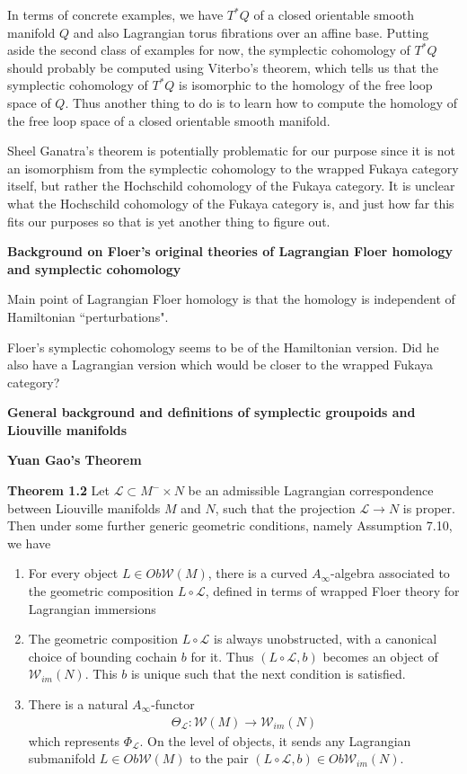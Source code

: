 \documentclass[hidelinks, 12pt]{article}
\theoremstyle{mydefstyle}
\theoremstyle{mythmstyle}
\newcounter{prop}
\begin{document}
In terms of concrete examples, we have $T^*Q$ of a closed orientable smooth manifold $Q$ and also Lagrangian torus fibrations over an affine base. Putting aside the second class of examples for now, the symplectic cohomology of $T^*Q$ should probably be computed using Viterbo's theorem, which tells us that the symplectic cohomology of $T^*Q$ is isomorphic to the homology of the free loop space of $Q$. Thus another thing to do is to learn how to compute the homology of the free loop space of a closed orientable smooth manifold. 

Sheel Ganatra's theorem is potentially problematic for our purpose since it is not an isomorphism from the symplectic cohomology to the wrapped Fukaya category itself, but rather the Hochschild cohomology of the Fukaya category. It is unclear what the Hochschild cohomology of the Fukaya category is, and just how far this fits our purposes so that is yet another thing to figure out. 

\textbf{Background on Floer's original theories of Lagrangian Floer homology and symplectic cohomology}

Main point of Lagrangian Floer homology is that the homology is independent of Hamiltonian ``perturbations".

Floer's symplectic cohomology seems to be of the Hamiltonian version. Did he also have a Lagrangian version which would be closer to the wrapped Fukaya category?

\textbf{General background and definitions of symplectic groupoids and Liouville manifolds}

\textbf{Yuan Gao's Theorem}

\textbf{Theorem 1.2} Let $\mathcal{L} \subset M^- \times N$ be an admissible Lagrangian correspondence between Liouville manifolds $M$ and $N$, such that the projection $\mathcal{L} \to N$ is proper. Then under some further generic geometric conditions, namely Assumption 7.10, we have
\begin{enumerate}[label = (\roman*)]
\item For every object $L \in Ob\mathcal{W}(M)$, there is a curved $A_{\infty}$-algebra associated to the geometric composition $L \circ \mathcal{L}$, defined in terms of wrapped Floer theory for Lagrangian immersions
\item The geometric composition $L \circ \mathcal{L}$ is always unobstructed, with a canonical choice of bounding cochain $b$ for it. Thus $(L \circ \mathcal{L}, b)$ becomes an object of $\mathcal{W}_{im}(N)$. This $b$ is unique such that the next condition is satisfied.
\item There is a natural $A_{\infty}$-functor
\begin{gather*}
\Theta_{\mathcal{L}} : \mathcal{W}(M) \to \mathcal{W}_{im}(N) \tag{1.5}
\end{gather*}
which represents $\Phi_{\mathcal{L}}$. On the level of objects, it sends any Lagrangian submanifold $L \in Ob\mathcal{W}(M)$ to the pair $(L \circ \mathcal{L}, b) \in Ob\mathcal{W}_{im}(N)$. 
\end{enumerate}
\end{document}
